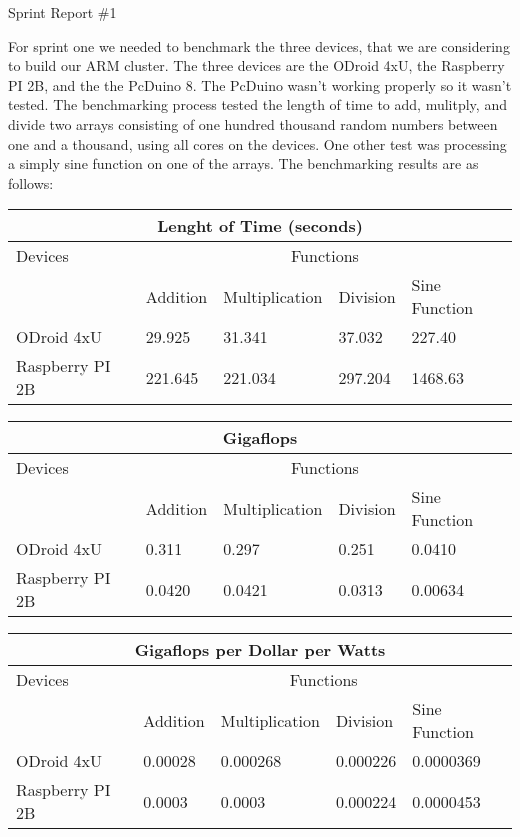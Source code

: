 \documentclass[11pt]{book}
\begin{document}
{\fontsize{16}{16}\selectfont Sprint Report \#1}

    For sprint one we needed to benchmark the three devices, that we are considering to build our ARM cluster. The three devices are the ODroid 4xU, the Raspberry PI 2B, and the the PcDuino 8.  The PcDuino wasn't working properly so it wasn't tested. The benchmarking process tested the length of time to add, mulitply, and divide two arrays consisting of one hundred thousand random numbers between one and a thousand, using all cores on the devices.  One other test was processing a simply sine function on one of the arrays.  The benchmarking results are as follows: 

\hfill \break

\begin{tabular}{|l|l|l|l|l|}
  \hline
  \multicolumn{5}{|c|}{Lenght of Time (seconds)} \\
  \hline
  Devices &
  \multicolumn{4}{|c|}{Functions} \\
  \hline
   & Addition & Multiplication & Division & Sine Function \\
  \hline
  ODroid 4xU & 29.925 & 31.341 & 37.032 & 227.40 \\
  \hline
  Raspberry PI 2B & 221.645 & 221.034 & 297.204 & 1468.63 \\
  \hline
\end{tabular}

\hfill \break

\begin{tabular}{|l|l|l|l|l|}
  \hline
  \multicolumn{5}{|c|}{Gigaflops} \\
  \hline
  Devices &
  \multicolumn{4}{|c|}{Functions} \\
  \hline
   & Addition & Multiplication & Division & Sine Function \\
  \hline
  ODroid 4xU & 0.311 & 0.297 & 0.251 & 0.0410 \\
  \hline
  Raspberry PI 2B & 0.0420 & 0.0421 & 0.0313 & 0.00634 \\
  \hline
\end{tabular}

\hfill \break

\begin{tabular}{|l|l|l|l|l|}
  \hline
  \multicolumn{5}{|c|}{Gigaflops per Dollar per Watts} \\
  \hline
  Devices &
  \multicolumn{4}{|c|}{Functions} \\
  \hline
   & Addition & Multiplication & Division & Sine Function \\
  \hline
  ODroid 4xU & 0.00028 & 0.000268 & 0.000226 & 0.0000369 \\
  \hline
  Raspberry PI 2B & 0.0003 & 0.0003 & 0.000224 & 0.0000453 \\
  \hline
\end{tabular}
\end{document}
